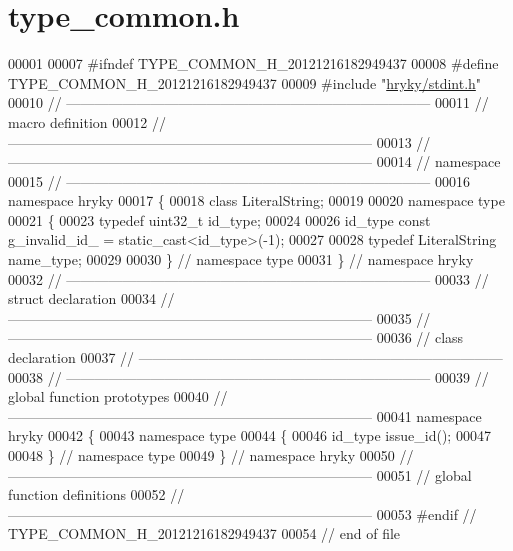 \hypertarget{type__common_8h_source}{\section{type\-\_\-common.\-h}
}

\begin{DoxyCode}
00001 
00007 \textcolor{preprocessor}{#ifndef TYPE\_COMMON\_H\_20121216182949437}
00008 \textcolor{preprocessor}{}\textcolor{preprocessor}{#define TYPE\_COMMON\_H\_20121216182949437}
00009 \textcolor{preprocessor}{}\textcolor{preprocessor}{#include "\hyperlink{stdint_8h}{hryky/stdint.h}"}
00010 \textcolor{comment}{//
      ------------------------------------------------------------------------------}
00011 \textcolor{comment}{// macro definition}
00012 \textcolor{comment}{//
      ------------------------------------------------------------------------------}
00013 \textcolor{comment}{//
      ------------------------------------------------------------------------------}
00014 \textcolor{comment}{// namespace}
00015 \textcolor{comment}{//
      ------------------------------------------------------------------------------}
00016 \textcolor{keyword}{namespace }hryky
00017 \{
00018     \textcolor{keyword}{class }LiteralString;
00019 
00020 \textcolor{keyword}{namespace }type
00021 \{
00023     \textcolor{keyword}{typedef} uint32\_t id\_type;
00024 
00026     id\_type \textcolor{keyword}{const} g\_invalid\_id\_ = \textcolor{keyword}{static\_cast<}id\_type\textcolor{keyword}{>}(-1);
00027 
00028     \textcolor{keyword}{typedef} LiteralString name\_type;
00029     
00030 \} \textcolor{comment}{// namespace type}
00031 \} \textcolor{comment}{// namespace hryky}
00032 \textcolor{comment}{//
      ------------------------------------------------------------------------------}
00033 \textcolor{comment}{// struct declaration}
00034 \textcolor{comment}{//
      ------------------------------------------------------------------------------}
00035 \textcolor{comment}{//
      ------------------------------------------------------------------------------}
00036 \textcolor{comment}{// class declaration}
00037 \textcolor{comment}{//
      ------------------------------------------------------------------------------}
00038 \textcolor{comment}{//
      ------------------------------------------------------------------------------}
00039 \textcolor{comment}{// global function prototypes}
00040 \textcolor{comment}{//
      ------------------------------------------------------------------------------}
00041 \textcolor{keyword}{namespace }hryky
00042 \{
00043 \textcolor{keyword}{namespace }type
00044 \{
00046     id\_type issue\_id();
00047 
00048 \} \textcolor{comment}{// namespace type}
00049 \} \textcolor{comment}{// namespace hryky}
00050 \textcolor{comment}{//
      ------------------------------------------------------------------------------}
00051 \textcolor{comment}{// global function definitions}
00052 \textcolor{comment}{//
      ------------------------------------------------------------------------------}
00053 \textcolor{preprocessor}{#endif // TYPE\_COMMON\_H\_20121216182949437}
00054 \textcolor{preprocessor}{}\textcolor{comment}{// end of file}
\end{DoxyCode}
